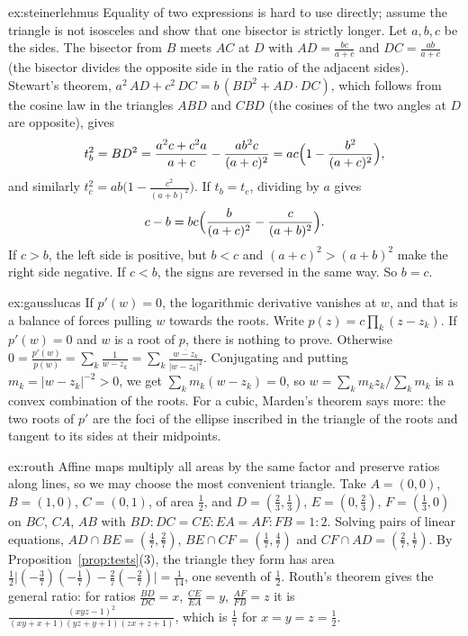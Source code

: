 \begin{solution}{ex:steinerlehmus}
\idea Equality of two expressions is hard to use directly; assume the triangle is not isosceles and show that one bisector is strictly
longer.
\writeup Let $a,b,c$ be the sides. The bisector from $B$ meets $AC$ at $D$ with $AD=\frac{bc}{a+c}$ and $DC=\frac{ab}{a+c}$ (the bisector
divides the opposite side in the ratio of the adjacent sides). Stewart's theorem, $a^2\,AD+c^2\,DC=b\,(BD^2+AD\cdot DC)$, which follows from the
cosine law in the triangles $ABD$ and $CBD$ (the cosines of the two angles at $D$ are opposite), gives
\[
t_b^2=BD^2=\frac{a^2c+c^2a}{a+c}-\frac{ab^2c}{(a+c)^2}=ac\Bigl(1-\frac{b^2}{(a+c)^2}\Bigr),
\]
and similarly $t_c^2=ab\bigl(1-\frac{c^2}{(a+b)^2}\bigr)$. If $t_b=t_c$, dividing by $a$ gives
\[
c-b=bc\Bigl(\frac b{(a+c)^2}-\frac c{(a+b)^2}\Bigr).
\]
If $c>b$, the left side is positive, but $b<c$ and $(a+c)^2>(a+b)^2$ make the right side negative. If $c<b$, the signs are reversed in
the same way. So $b=c$.
\end{solution}

\begin{solution}{ex:gausslucas}
\idea If $p'(w)=0$, the logarithmic derivative vanishes at $w$, and that is a balance of forces pulling $w$ towards the roots.
\writeup Write $p(z)=c\prod_k(z-z_k)$. If $p'(w)=0$ and $w$ is a root of $p$, there is nothing to prove. Otherwise
$0=\frac{p'(w)}{p(w)}=\sum_k\frac1{w-z_k}=\sum_k\frac{\overline{w-z_k}}{|w-z_k|^2}$. Conjugating and putting $m_k=|w-z_k|^{-2}>0$, we get
$\sum_km_k(w-z_k)=0$, so $w=\sum_km_kz_k/\sum_km_k$ is a convex combination of the roots. For a cubic, Marden's theorem says more: the two
roots of $p'$ are the foci of the ellipse inscribed in the triangle of the roots and tangent to its sides at their midpoints.
\end{solution}

\begin{solution}{ex:routh}
\idea Affine maps multiply all areas by the same factor and preserve ratios along lines, so we may choose the most convenient triangle.
\writeup Take $A=(0,0)$, $B=(1,0)$, $C=(0,1)$, of area $\frac12$, and $D=(\frac23,\frac13)$, $E=(0,\frac23)$, $F=(\frac13,0)$ on $BC$, $CA$, $AB$
with $BD:DC=CE:EA=AF:FB=1:2$. Solving pairs of linear equations, $AD\cap BE=(\frac47,\frac27)$, $BE\cap CF=(\frac17,\frac47)$ and
$CF\cap AD=(\frac27,\frac17)$. By Proposition~\ref{prop:tests}(3), the triangle they form has area
$\frac12\bigl|(-\frac37)(-\frac17)-\frac27(-\frac27)\bigr|=\frac1{14}$, one seventh of $\frac12$. Routh's theorem gives the general ratio: for
ratios $\frac{BD}{DC}=x$, $\frac{CE}{EA}=y$, $\frac{AF}{FB}=z$ it is $\frac{(xyz-1)^2}{(xy+x+1)(yz+y+1)(zx+z+1)}$, which is $\frac17$ for $x=y=z=\frac12$.
\end{solution}

